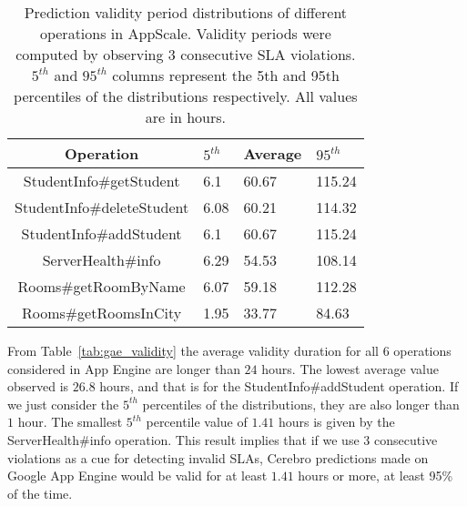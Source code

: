 
\begin{table}[htdp]
\caption{Prediction validity period distributions of different operations in
AppScale. Validity periods were computed by observing 3 consecutive SLA
violations. $5^{th}$ and $95^{th}$ 
columns represent the 5th and 95th percentiles of the
distributions respectively. All values are in hours.}
\begin{center}
\begin{tabular}{|c|p{1cm}|p{1cm}|p{1cm}|}
\hline
Operation & $5^{th}$ & Average & $95^{th}$ \\ \hline
StudentInfo\#getStudent & 6.1 & 60.67 & 115.24 \\ \hline
StudentInfo\#deleteStudent & 6.08 & 60.21 & 114.32 \\ \hline
StudentInfo\#addStudent & 6.1 & 60.67 & 115.24 \\ \hline
ServerHealth\#info & 6.29 & 54.53 & 108.14 \\ \hline
Rooms\#getRoomByName & 6.07 & 59.18 & 112.28 \\ \hline
Rooms\#getRoomsInCity & 1.95 & 33.77 & 84.63 \\ \hline
\end{tabular}
\end{center}
\label{tab:as_validity}
\end{table}

From Table~\ref{tab:gae_validity} 
the average validity duration for all 6 operations considered in App Engine are
longer than $24$ hours. The lowest average value observed is $26.8$ hours, 
and that is for the StudentInfo\#addStudent operation. If we
just consider the $5^{th}$ percentiles of the distributions, they are 
also longer than $1$ hour. The smallest $5^{th}$ percentile value of 
$1.41$ hours is 
given by the ServerHealth\#info operation. This result implies that if we use 
$3$ consecutive violations as a cue for detecting invalid SLAs,
Cerebro predictions made on Google App Engine would be valid for at least
$1.41$ hours or more, at least 95\% of the time.

